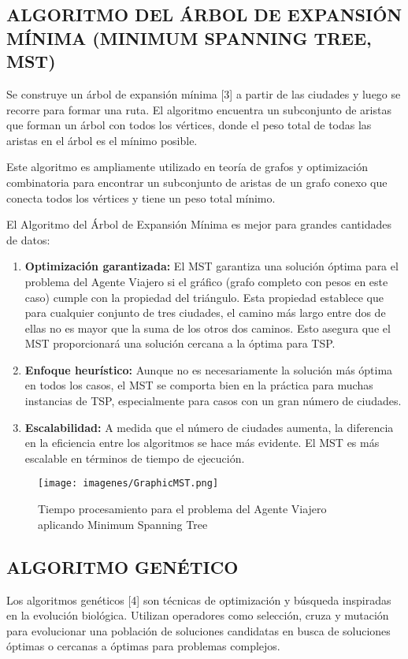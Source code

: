 \documentclass{article}
\begin{document}
\subsection{ALGORITMO DEL ÁRBOL DE EXPANSIÓN MÍNIMA (MINIMUM SPANNING TREE, MST)}
Se construye un árbol de expansión mínima [3] a partir de las ciudades y luego se recorre para formar una ruta. El algoritmo encuentra un subconjunto de aristas que forman un árbol con todos los vértices, donde el peso total de todas las aristas en el árbol es el mínimo posible.

Este algoritmo es ampliamente utilizado en teoría de grafos y optimización combinatoria para encontrar un subconjunto de aristas de un grafo conexo que conecta todos los vértices y tiene un peso total mínimo.

El Algoritmo del Árbol de Expansión Mínima es mejor para grandes cantidades de datos:

    \begin{enumerate}
        \item \textbf{Optimización garantizada:} El MST garantiza una solución óptima para el problema del Agente Viajero si el gráfico (grafo completo con pesos en este caso) cumple con la propiedad del triángulo. Esta propiedad establece que para cualquier conjunto de tres ciudades, el camino más largo entre dos de ellas no es mayor que la suma de los otros dos caminos. Esto asegura que el MST proporcionará una solución cercana a la óptima para TSP.
        
        \item \textbf{Enfoque heurístico:} Aunque no es necesariamente la solución más óptima en todos los casos, el MST se comporta bien en la práctica para muchas instancias de TSP, especialmente para casos con un gran número de ciudades.
        
        \item \textbf{Escalabilidad:} A medida que el número de ciudades aumenta, la diferencia en la eficiencia entre los algoritmos se hace más evidente. El MST es más escalable en términos de tiempo de ejecución.
    \end{enumerate}

\begin{figure}[H]
    \centering
    \texttt{[image: imagenes/GraphicMST.png]}
    \caption{\label{fig:GraphicMST}Tiempo procesamiento para el problema del Agente Viajero aplicando Minimum Spanning Tree}
\end{figure}

\subsection{ALGORITMO GENÉTICO}
Los algoritmos genéticos [4] son técnicas de optimización y búsqueda inspiradas en la evolución biológica. Utilizan operadores como selección, cruza y mutación para evolucionar una población de soluciones candidatas en busca de soluciones óptimas o cercanas a óptimas para problemas complejos.
\end{document}
